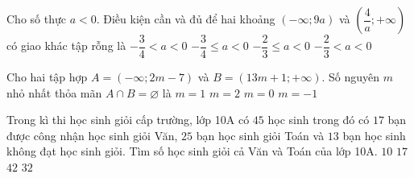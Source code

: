 \begin{ex}%
	Cho số thực $a<0$. Điều kiện cần và đủ để hai khoảng $\left(-\infty;9a\right)$ và $\left(\dfrac{4}{a};+\infty\right)$ có giao khác tập rỗng là
	\choice
	{$-\dfrac{3}{4}<a<0$}
	{$-\dfrac{3}{4}\le a<0$}
	{$-\dfrac{2}{3}\le a<0$}
	{\True$-\dfrac{2}{3}<a<0$}
\end{ex}

\begin{ex}%
	Cho hai tập hợp $A=(-\infty; 2m-7)$ và $B=(13m+1; +\infty)$. Số nguyên $m$ nhỏ nhất thỏa mãn $A\cap B = \varnothing$ là
	\choice
	{$m=1$}
	{$m=2$}
	{\True $m=0$}
	{$m=-1$}
\end{ex}

\begin{ex}%
	Trong kì thi học sinh giỏi cấp trường, lớp 10A có $45$ học sinh trong đó có  $17$ bạn được công nhận học sinh giỏi Văn, $25$ bạn học sinh giỏi Toán và $13$ bạn học sinh không đạt học sinh giỏi. Tìm số học sinh giỏi cả Văn và Toán của lớp 10A.
	\choice
	{\True $10$}
	{$17$}
	{$42$ }
	{$32$}
\end{ex}


